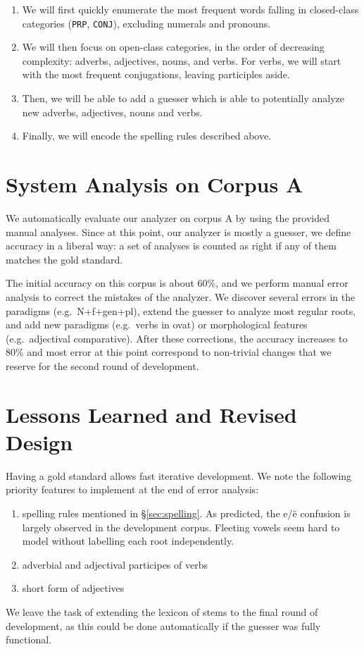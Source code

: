 \documentclass[11pt,letterpaper]{article}
\newcommand\textcyr[1]{{\fontencoding{OT2}\fontfamily{wncyr}\selectfont #1}}
\begin{document}
\begin{enumerate}
  \item We will first quickly enumerate the most frequent words falling in closed-class categories (\texttt{PRP}, \texttt{CONJ}), excluding numerals and pronouns.
  \item We will then focus on open-class categories, in the order of decreasing complexity: adverbs, adjectives, nouns, and verbs. For verbs, we will start with the most frequent conjugations, leaving participles aside.
  \item Then, we will be able to add a guesser which is able to potentially analyze new adverbs, adjectives, nouns and verbs.
  \item Finally, we will encode the spelling rules described above.
\end{enumerate}

\section{System Analysis on Corpus A}

We automatically evaluate our analyzer on corpus A by using the provided manual analyses. Since at this point, our analyzer is mostly a guesser, we define accuracy in a liberal way: a set of analyses is counted as right if any of them matches the gold standard.

The initial accuracy on this corpus is about 60\%, and we perform manual error analysis to correct the mistakes of the analyzer. We discover several errors in the paradigms (e.g.~N+f+gen+pl), extend the guesser to analyze most regular roots, and add new paradigms (e.g.~verbs in \textcyr{ovat\cyrsftsn}) or morphological features (e.g.~adjectival comparative). After these corrections, the accuracy increases to 80\% and most error at this point correspond to non-trivial changes that we reserve for the second round of development.

\section{Lessons Learned and Revised Design}

Having a gold standard allows fast iterative development. We note the following priority features to implement at the end of error analysis:
\begin{enumerate}
  \item spelling rules mentioned in \S\ref{sec:spelling}. As predicted, the \textcyr{e}/\textcyr{\"e} confusion is largely observed in the development corpus. Fleeting vowels seem hard to model without labelling each root independently.
  \item adverbial and adjectival participes of verbs
  \item short form of adjectives
\end{enumerate}
We leave the task of extending the lexicon of stems to the final round of development, as this could be done automatically if the guesser was fully functional.
\end{document}
